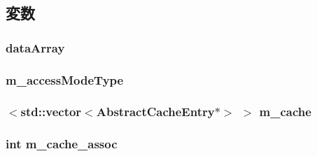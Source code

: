 \subsection{変数}
\hypertarget{classCacheMemory_a3fe8de4d2516b188e76e11c5213d8eaf}{
\subsubsection[{dataArray}]{ {\bf dataArray}}}
\label{classCacheMemory_a3fe8de4d2516b188e76e11c5213d8eaf}
\hypertarget{classCacheMemory_a83d90a771e3ee60100ef1730f1a118b1}{
\subsubsection[{m\_\-accessModeType}]{ {\bf m\_\-accessModeType}}}
\label{classCacheMemory_a83d90a771e3ee60100ef1730f1a118b1}
\hypertarget{classCacheMemory_a07906f5e66f388186af8b84540922dcd}{
\subsubsection[{m\_\-cache}]{$<${\bf std::vector}$<${\bf AbstractCacheEntry}$\ast$$>$ $>$ {\bf m\_\-cache}}}
\label{classCacheMemory_a07906f5e66f388186af8b84540922dcd}
\hypertarget{classCacheMemory_a0dcca2db5987fbc671fc1fef4169ebed}{
\subsubsection[{m\_\-cache\_\-assoc}]{\setlength{\rightskip}{0pt plus 5cm}int {\bf m\_\-cache\_\-assoc}}}
\label{classCacheMemory_a0dcca2db5987fbc671fc1fef4169ebed}
